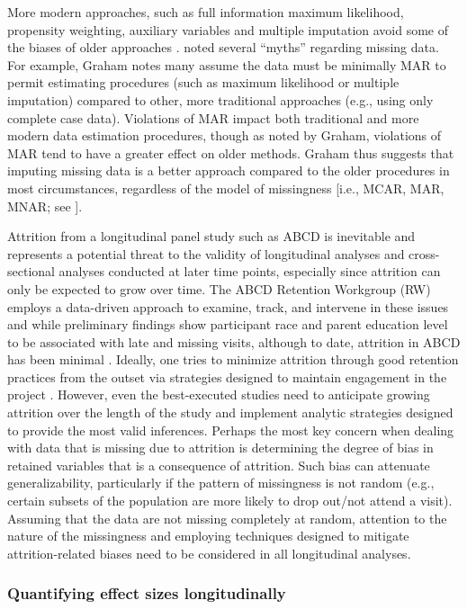 \documentclass[
  number,
  preprint,
  3p,
  twocolumn]{elsarticle}
\begin{document}
More modern approaches, such as full information maximum likelihood,
propensity weighting, auxiliary variables and multiple imputation avoid
some of the biases of older approaches
\citep[see][]{enders2010, graham2009}. \citep{graham2009} noted several
``myths'' regarding missing data. For example, Graham notes many assume
the data must be minimally MAR to permit estimating procedures (such as
maximum likelihood or multiple imputation) compared to other, more
traditional approaches (e.g., using only complete case data). Violations
of MAR impact both traditional and more modern data estimation
procedures, though as noted by Graham, violations of MAR tend to have a
greater effect on older methods. Graham thus suggests that imputing
missing data is a better approach compared to the older procedures in
most circumstances, regardless of the model of missingness {[}i.e.,
MCAR, MAR, MNAR; see \citep{graham2009}{]}.

Attrition from a longitudinal panel study such as ABCD is inevitable and
represents a potential threat to the validity of longitudinal analyses
and cross-sectional analyses conducted at later time points, especially
since attrition can only be expected to grow over time. The ABCD
Retention Workgroup (RW) employs a data-driven approach to examine,
track, and intervene in these issues and while preliminary findings show
participant race and parent education level to be associated with late
and missing visits, although to date, attrition in ABCD has been minimal
\citep{ewing2022}. Ideally, one tries to minimize attrition through good
retention practices from the outset via strategies designed to maintain
engagement in the project \citep{cotter2005, hill2016, watson2018}.
However, even the best-executed studies need to anticipate growing
attrition over the length of the study and implement analytic strategies
designed to provide the most valid inferences. Perhaps the most key
concern when dealing with data that is missing due to attrition is
determining the degree of bias in retained variables that is a
consequence of attrition. Such bias can attenuate generalizability,
particularly if the pattern of missingness is not random (e.g., certain
subsets of the population are more likely to drop out/not attend a
visit). Assuming that the data are not missing completely at random,
attention to the nature of the missingness and employing techniques
designed to mitigate attrition-related biases need to be considered in
all longitudinal analyses.

\hypertarget{quantifying-effect-sizes-longitudinally}{%
\subsubsection{Quantifying effect sizes
longitudinally}\label{quantifying-effect-sizes-longitudinally}}
\end{document}
